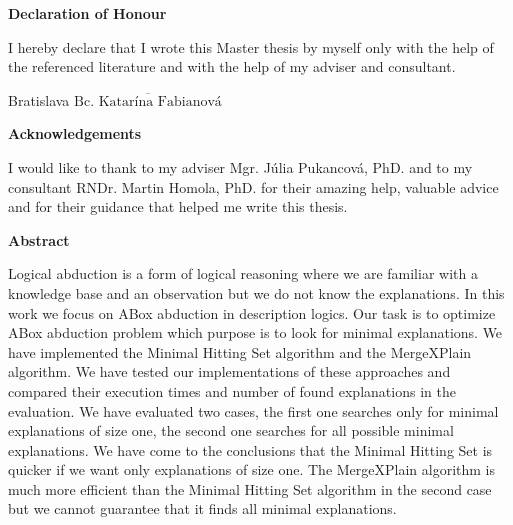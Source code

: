\documentclass[12pt,a4paper]{article}
\newcommand{\textoverline}[1]{{\setul{-5em}{}$\overline{\mbox{#1}}$}}
\begin{document}
\pagebreak



\pagebreak



\justify

\pagebreak
\thispagestyle{empty}
\vspace*{15cm}
{\large\bf Declaration of Honour \par}
\vspace{0.8cm}
{\large{I hereby declare that I wrote this Master thesis by myself only with the help of the referenced literature and with the help of my adviser and consultant.}} \par
\vspace{3cm}
{\large{Bratislava \hfill \textoverline{Bc. Katarína Fabianová}}}

\pagebreak
\thispagestyle{empty}
\par\vspace*{15cm}
{\large\bf \noindent Acknowledgements \par}
\vspace{0.8cm}
{\large{I would like to thank to my adviser Mgr. Júlia Pukancová, PhD. and to my consultant RNDr. Martin Homola, PhD. for their amazing help, valuable advice and for their guidance that helped me write this thesis.}}

\pagebreak
\thispagestyle{empty}
{\large\bf  \noindent Abstract \newline} 

Logical abduction is a form of logical reasoning where we are familiar with a knowledge base and an observation but we do not know the explanations. In this work we focus on ABox abduction in description logics. Our task is to optimize ABox abduction problem which purpose is to look for minimal explanations. We have implemented the Minimal Hitting Set algorithm and the MergeXPlain algorithm. We have tested our implementations of these approaches and compared their execution times and number of found explanations in the evaluation. We have evaluated two cases, the first one searches only for minimal explanations of size one, the second one searches for all possible minimal explanations. We have come to the conclusions that the Minimal Hitting Set is quicker if we want only explanations of size one. The MergeXPlain algorithm is much more efficient than the Minimal Hitting Set algorithm in the second case but we cannot guarantee that it finds all minimal explanations. \newline
\end{document}
